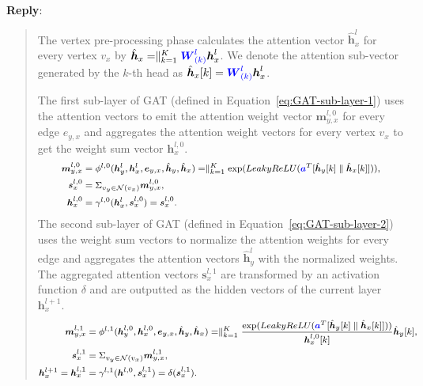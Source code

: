 \documentclass[12pt]{article}
\newcommand{\MyVec}[1]{\boldsymbol{#1}}
\newcommand{\MyMat}[1]{\boldsymbol{#1}}
\newcommand{\hvec}[1]{\hat{\boldsymbol{h}}_{#1}}
\newcommand{\Param}[1]{\textcolor{blue}{#1}}
\newenvironment{myquote}%
{\begin{leftbar}\begin{quote}}
{\end{quote}\end{leftbar}}
\newenvironment{reply}
   {\medskip \noindent \textbf{Reply}:\  }
   {\medskip}
\begin{document}
\begin{reply}
\begin{myquote}
        The vertex pre-processing phase calculates the attention vector $\hat{\boldsymbol{h}}^{l}_{x}$ for every vertex $v_x$ by $\hvec{x} = \parallel_{k=1}^K \Param{\MyMat{W}^l_{(k)}}\MyVec{h}^l_x$. We denote the attention sub-vector generated by the $k$-th head as $\hvec{x}[k]=\Param{\MyMat{W}^l_{(k)}}\MyVec{h}^l_x$.
        
        The first sub-layer of GAT (defined in Equation~\ref{eq:GAT-sub-layer-1}) uses the attention vectors to emit the attention weight vector $\boldsymbol{m}^{l,0}_{y,x}$ for every edge $e_{y,x}$ and aggregates the attention weight vectors for every vertex $v_x$ to get the weight sum vector $\MyVec{h}^{l,0}_x$.
        \begin{equation}
            \footnotesize
            \label{eq:GAT-sub-layer-1}
            \begin{aligned}
                \MyVec{m}^{l,0}_{y,x} & = \phi^{l,0}(\MyVec{h}^l_y, \MyVec{h}^l_x, \MyVec{e}_{y,x}, \hvec{y}, \hvec{x}) = \parallel_{k=1}^{K}\GATCalcWeight, \\
                \MyVec{s}^{l,0}_{x} &= {\Sigma}_{v_y \in \mathcal{N}(v_x)}{\MyVec{m}^{l,0}_{y,x}}, \\
                \MyVec{h}^{l,0}_{x} &= \gamma^{l,0}(\MyVec{h}^l_x, \MyVec{s}^{l,0}_{x})  = \MyVec{s}^{l,0}_{x}.
            \end{aligned}
        \end{equation}
        The second sub-layer of GAT (defined in Equation~\ref{eq:GAT-sub-layer-2}) uses the weight sum vectors to normalize the attention weights for every edge and aggregates the attention vectors $\boldsymbol{\hat{h}}^l_y$ with the normalized weights.
        The aggregated attention vectors $\MyVec{s}^{l,1}_x$ are transformed by an activation function $\delta$ and are outputted as the hidden vectors of the current layer $\MyVec{h}^{l+1}_x$.
        \begin{equation}
            \footnotesize
            \label{eq:GAT-sub-layer-2}
            \begin{aligned}
                \MyVec{m}^{l,1}_{y,x} &= \phi^{l,1}(\MyVec{h}^{l,0}_y, \MyVec{h}^{l,0}_x, \MyVec{e}_{y,x}, \hvec{y}, \hvec{x}) = \parallel_{k=1}^{K}\frac{\GATCalcWeight}{\MyVec{h}^{l,0}_x[k]}\hvec{y}[k], \\
                \MyVec{s}^{l,1}_x &= {\Sigma}_{v_y \in \mathcal{N}(v_x)} \MyVec{m}^{l,1}_{y,x}, \\
                \MyVec{h}^{l+1}_x = \MyVec{h}^{l,1}_x &= \gamma^{l,1}(\MyVec{h}^{l,0}, \MyVec{s}^{l,1}_x) = \delta(\MyVec{s}^{l,1}_x).
            \end{aligned}
        \end{equation}
    \end{myquote}  
\end{reply}
\end{document}
